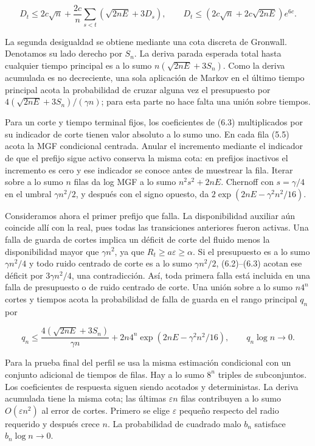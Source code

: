 \documentclass[spanish,11pt,a4paper]{article}
\begin{document}
\nopagebreak[4]
\[D_t\le2c\sqrt n+\frac{2c}{n}\sum_{s<t}(\sqrt{2nE}+3D_s),\qquad
D_t\le(2c\sqrt n+2c\sqrt{2nE})e^{6c}.\tag{6.4}\]

La segunda desigualdad se obtiene mediante una cota discreta de Gronwall. Denotamos su lado derecho por \(S_n\). La deriva parada esperada total hasta cualquier tiempo principal es a lo sumo \(n(\sqrt{2nE}+3S_n)\). Como la deriva acumulada es no decreciente, una sola aplicación de Markov en el último tiempo principal acota la probabilidad de cruzar alguna vez el presupuesto por \(4(\sqrt{2nE}+3S_n)/(\gamma n)\); para esta parte no hace falta una unión sobre tiempos.

Para un corte y tiempo terminal fijos, los coeficientes de (6.3) multiplicados por su indicador de corte tienen valor absoluto a lo sumo uno. En cada fila (5.5) acota la MGF condicional centrada. Anular el incremento mediante el indicador de que el prefijo sigue activo conserva la misma cota: en prefijos inactivos el incremento es cero y ese indicador se conoce antes de muestrear la fila. Iterar sobre a lo sumo \(n\) filas da log MGF a lo sumo \(n^2s^2+2nE\). Chernoff con \(s=\gamma/4\) en el umbral \(\gamma n^2/2\), y después con el signo opuesto, da \(2\exp(2nE-\gamma^2n^2/16)\).

Consideramos ahora el primer prefijo que falla. La disponibilidad auxiliar aún coincide allí con la real, pues todas las transiciones anteriores fueron activas. Una falla de guarda de cortes implica un déficit de corte del fluido menos la disponibilidad mayor que \(\gamma n^2\), ya que \(R_t\ge a\varepsilon\ge\alpha\). Si el presupuesto es a lo sumo \(\gamma n^2/4\) y todo ruido centrado de corte es a lo sumo \(\gamma n^2/2\), (6.2)--(6.3) acotan ese déficit por \(3\gamma n^2/4\), una contradicción. Así, toda primera falla está incluida en una falla de presupuesto o de ruido centrado de corte. Una unión sobre a lo sumo \(n4^n\) cortes y tiempos acota la probabilidad de falla de guarda en el rango principal \(q_n\) por

\nopagebreak[4]
\[q_n\le\frac{4(\sqrt{2nE}+3S_n)}{\gamma n}
+2n4^n\exp(2nE-\gamma^2n^2/16),\qquad q_n\log n\longrightarrow0.
\tag{6.4'}\]

Para la prueba final del perfil se usa la misma estimación condicional con un conjunto adicional de tiempos de filas. Hay a lo sumo \(8^n\) triples de subconjuntos. Los coeficientes de respuesta siguen siendo acotados y deterministas. La deriva acumulada tiene la misma cota; las últimas \(\varepsilon n\) filas contribuyen a lo sumo \(O(\varepsilon n^2)\) al error de cortes. Primero se elige \(\varepsilon\) pequeño respecto del radio requerido y después crece \(n\). La probabilidad de cuadrado malo \(b_n\) satisface \(b_n\log n\to0\).
\end{document}
